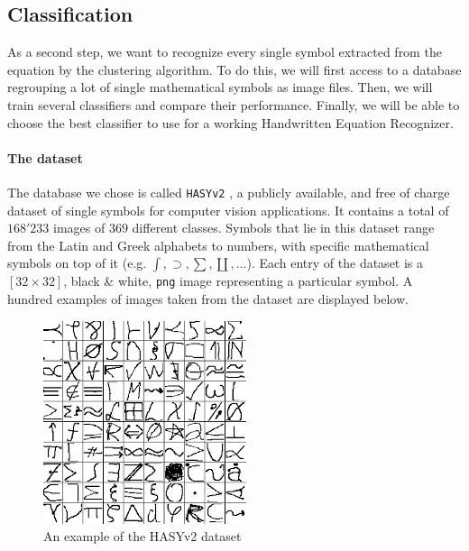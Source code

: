 \documentclass[twocolumn]{article}%
\begin{document}
	\subsection{Classification}
		As a second step, we want to recognize every single symbol extracted from the equation by the clustering algorithm. To do this, we will first access to a database regrouping a lot of single mathematical symbols as image files. Then, we will train several classifiers and compare their performance. Finally, we will be able to choose the best classifier to use for a working Handwritten Equation Recognizer.
		
	\paragraph{The dataset}
	The database we chose is called \texttt{HASYv2} \cite{hasyv2}, a publicly available, and free of charge dataset of
single symbols for computer vision applications. It contains a total of $168'233$ images of $369$ different classes. Symbols that lie in this dataset range from the Latin and Greek alphabets to numbers, with specific mathematical symbols on top of it (e.g. $\int, \supset, \sum, \coprod, ...$). Each entry of the dataset is a $[32\times32]$, black \& white, \texttt{png} image representing a particular symbol. A hundred examples of images taken from the dataset are displayed below.

	\begin{figure}[htp]
	\centering
	\includegraphics[scale=0.9]{images/hasyv2.png}
	\caption{An example of the HASYv2 dataset}
	\end{figure}
\end{document}
